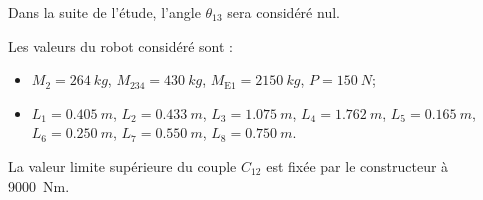 Dans la suite de l'étude, l'angle $\theta_{13}$ sera considéré nul.


Les valeurs du robot considéré sont :
\begin{itemize}
\item $M_{2}=\SI{264}{kg}$, $M_{234}=\SI{430}{kg}$, $M_{\text{E1}}=\SI{2150}{kg}$, $P=\SI{150}{N}$;
\item $L_{1}=\SI{0,405}{m}$, $L_{2}=\SI{0,433}{m}$, $L_{3}=\SI{1,075}{m}$, $L_{4}=\SI{1,762}{m}$, $L_{5}=\SI{0,165}{m}$, $L_{6}=\SI{0,250}{m}$, $L_{7}=\SI{0,550}{m}$, $L_{8}=\SI{0,750}{m}$.
\end{itemize}


La valeur limite supérieure du couple $C_{12}$ est fixée par le constructeur à \SI{9000}{Nm}.

